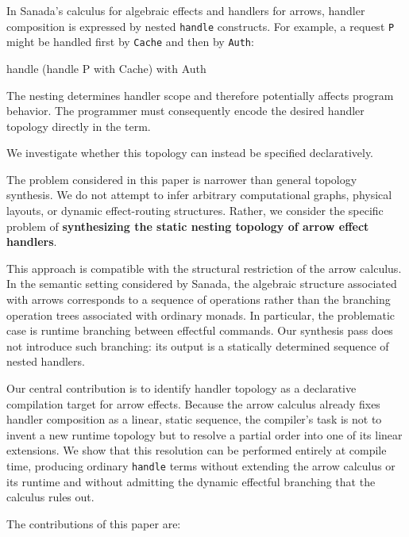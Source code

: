 \documentclass[
  11pt,
]{article}
\newenvironment{Shaded}{}{}
\newcommand{\NormalTok}[1]{#1}
\begin{document}
In Sanada's calculus for algebraic effects and handlers for arrows,
handler composition is expressed by nested \texttt{handle} constructs.
For example, a request \texttt{P} might be handled first by
\texttt{Cache} and then by \texttt{Auth}:

\begin{Shaded}
\begin{Highlighting}[]
\NormalTok{handle (handle P with Cache) with Auth}
\end{Highlighting}
\end{Shaded}

The nesting determines handler scope and therefore potentially affects
program behavior. The programmer must consequently encode the desired
handler topology directly in the term.

We investigate whether this topology can instead be specified
declaratively.

The problem considered in this paper is narrower than general topology
synthesis. We do not attempt to infer arbitrary computational graphs,
physical layouts, or dynamic effect-routing structures. Rather, we
consider the specific problem of \textbf{synthesizing the static nesting
topology of arrow effect handlers}.

This approach is compatible with the structural restriction of the arrow
calculus. In the semantic setting considered by Sanada, the algebraic
structure associated with arrows corresponds to a sequence of operations
rather than the branching operation trees associated with ordinary
monads. In particular, the problematic case is runtime branching between
effectful commands. Our synthesis pass does not introduce such
branching: its output is a statically determined sequence of nested
handlers.

Our central contribution is to identify handler topology as a
declarative compilation target for arrow effects. Because the arrow
calculus already fixes handler composition as a linear, static sequence,
the compiler's task is not to invent a new runtime topology but to
resolve a partial order into one of its linear extensions. We show that
this resolution can be performed entirely at compile time, producing
ordinary \texttt{handle} terms without extending the arrow calculus or
its runtime and without admitting the dynamic effectful branching that
the calculus rules out.

The contributions of this paper are:
\end{document}
